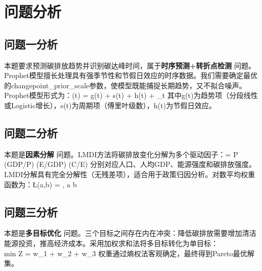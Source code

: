 \newpage
\section{问题分析}

\subsection{问题一分析}
本题要求预测碳排放趋势并识别碳达峰时间，属于\textbf{时序预测+转折点检测}
问题。Prophet模型擅长处理具有强季节性和节假日效应的时序数据。我们需要确定最优的changepoint_prior_scale参数，使模型既能捕捉长期趋势，又不拟合噪声。Prophet模型形式为：\y(t) = g(t) + s(t) + h(t) + \epsilon_t
其中g(t)为趋势项（分段线性或Logistic增长），s(t)为周期项（傅里叶级数），h(t)为节假日效应。

\subsection{问题二分析}
本题是\textbf{因素分解}
问题。LMDI方法将碳排放变化分解为多个驱动因子：\C = P \cdot (GDP/P) \cdot (E/GDP) \cdot (C/E)
分别对应人口、人均GDP、能源强度和碳排放强度。LMDI分解具有完全分解性（无残差项），适合用于政策归因分析。对数平均权重函数为：\L(a,b) = , \quad a \neq b

\subsection{问题三分析}
本题是\textbf{多目标优化}
问题。三个目标之间存在内在冲突：降低碳排放需要增加清洁能源投资，推高经济成本。采用加权求和法将多目标转化为单目标：\\min \quad Z = w_1 \cdot {} + w_2 \cdot {} + w_3 \cdot {}
权重通过熵权法客观确定，最终得到Pareto最优解集。